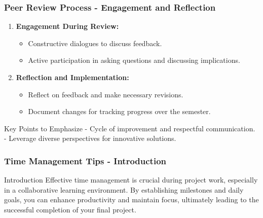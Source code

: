 \documentclass[aspectratio=169]{beamer}
\begin{document}
\begin{frame}[fragile]
    \frametitle{Peer Review Process - Engagement and Reflection}
    \begin{enumerate}[resume]
        \item \textbf{Engagement During Review:}
        \begin{itemize}
            \item Constructive dialogues to discuss feedback.
            \item Active participation in asking questions and discussing implications.
        \end{itemize}
        
        \item \textbf{Reflection and Implementation:}
        \begin{itemize}
            \item Reflect on feedback and make necessary revisions.
            \item Document changes for tracking progress over the semester.
        \end{itemize}
    \end{enumerate}
    
    \begin{block}{Key Points to Emphasize}
        - Cycle of improvement and respectful communication.
        - Leverage diverse perspectives for innovative solutions.
    \end{block}
\end{frame}

\begin{frame}[fragile]
    \frametitle{Time Management Tips - Introduction}
    \begin{block}{Introduction}
        Effective time management is crucial during project work, especially in a collaborative learning environment. By establishing milestones and daily goals, you can enhance productivity and maintain focus, ultimately leading to the successful completion of your final project.
    \end{block}
\end{frame}
\end{document}
